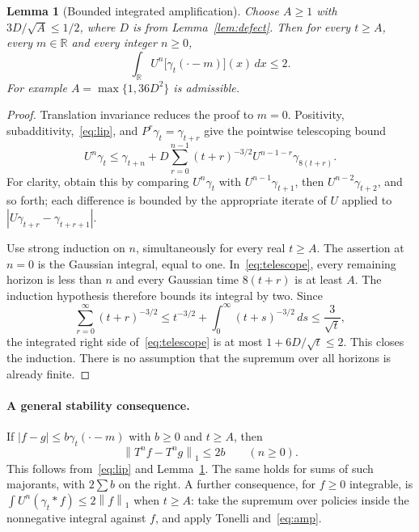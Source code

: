 \documentclass[11pt]{article}
\newtheorem{lemma}[theorem]{Lemma}
\newcommand{\R}{\mathbb R}
\newcommand{\norm}[1]{\left\|#1\right\|_1}
\begin{document}
\begin{lemma}[Bounded integrated amplification]\label{lem:amp}
Choose $A\ge1$ with $3D/\sqrt A\le1/2$, where $D$ is from
Lemma~\ref{lem:defect}. Then for every $t\ge A$, every $m\in\R$
and every integer $n\ge0$,
\begin{equation}\label{eq:amp}
 \boxed{\int_\R U^n\bigl[\gamma_t(\cdot-m)\bigr](x)\,dx\le2.}
\end{equation}
For example $A=\max\{1,36D^2\}$ is admissible.
\end{lemma}
\begin{proof}
Translation invariance reduces the proof to $m=0$. Positivity,
subadditivity,~\eqref{eq:lip}, and $P^r\gamma_t=\gamma_{t+r}$ give
the pointwise telescoping bound
\begin{equation}\label{eq:telescope}
 U^n\gamma_t\le\gamma_{t+n}
 +D\sum_{r=0}^{n-1}(t+r)^{-3/2}
                   U^{n-1-r}\gamma_{8(t+r)}.
\end{equation}
For clarity, obtain this by comparing $U^n\gamma_t$ with
$U^{n-1}\gamma_{t+1}$, then $U^{n-2}\gamma_{t+2}$, and so forth;
each difference is bounded by the appropriate iterate of $U$ applied
to $|U\gamma_{t+r}-\gamma_{t+r+1}|$.

Use strong induction on $n$, simultaneously for every real $t\ge A$.
The assertion at $n=0$ is the Gaussian integral, equal to one.
In~\eqref{eq:telescope}, every remaining horizon is less than $n$
and every Gaussian time $8(t+r)$ is at least $A$. The induction
hypothesis therefore bounds its integral by two. Since
\[
 \sum_{r=0}^\infty(t+r)^{-3/2}
 \le t^{-3/2}+\int_0^\infty(t+s)^{-3/2}\,ds
 \le\frac3{\sqrt t},
\]
the integrated right side of~\eqref{eq:telescope} is at most
$1+6D/\sqrt t\le2$. This closes the induction. There is no assumption
that the supremum over all horizons is already finite.
\end{proof}

\paragraph{A general stability consequence.}
If $|f-g|\le b\gamma_t(\cdot-m)$ with $b\ge0$ and $t\ge A$, then
\begin{equation}\label{eq:stab}
 \norm{T^nf-T^ng}\le2b\qquad(n\ge0).
\end{equation}
This follows from~\eqref{eq:lip} and Lemma~\ref{lem:amp}.
The same holds for sums of such majorants, with $2\sum b$ on the
right. A further consequence, for $f\ge0$ integrable, is
$\int U^n(\gamma_t*f)\le2\norm f$ when $t\ge A$:
take the supremum over policies inside the nonnegative integral
against $f$, and apply Tonelli and~\eqref{eq:amp}.
\end{document}
